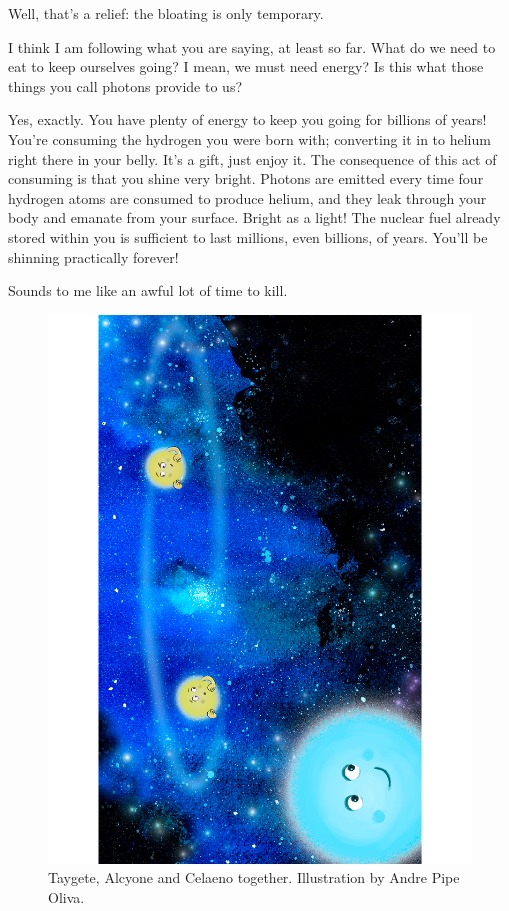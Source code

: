 \documentclass[main.tex]{subfiles}
\begin{document}
\par \Sterope Well, that's a relief: the bloating is only temporary.

\par \Alcyone I think I am following what you are saying, at least so far.  What do we need to eat to keep ourselves going?  I mean, we must need energy?  Is this what those things you call photons provide to us?

\par \Maia Yes, exactly.  You have plenty of energy to keep you going for billions of years!  You're consuming the hydrogen you were born with; converting it in to helium right there in your belly.  It's a gift, just enjoy it.  The consequence of this act of consuming is that you shine very bright.  Photons are emitted every time four hydrogen atoms are consumed to produce helium, and they leak through your body and emanate from your surface.  Bright as a light!  The nuclear fuel already stored within you is sufficient to last millions, even billions, of years.  You'll be shinning practically forever!

\par \Celaeno Sounds to me like an awful lot of time to kill.

\begin{figure}
\includegraphics[width=\columnwidth,angle=270,origin=c]{ch1_2.pdf}
\caption{Taygete, Alcyone and Celaeno together.  Illustration by Andre Pipe Oliva.
\label{fig:fig2}}
\end{figure}
\end{document}
